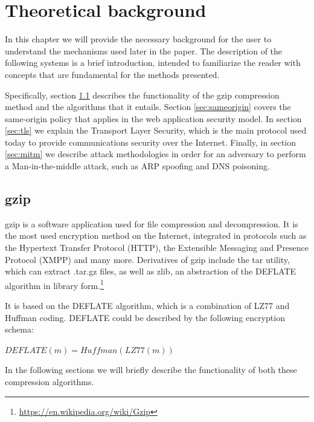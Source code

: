 \chapter{Theoretical background}\label{background}

In this chapter we will provide the necessary background for the user to
understand the mechanisms used later in the paper. The description of the
following systems is a brief introduction, intended to familiarize the reader
with concepts that are fundamental for the methods presented.

Specifically, section \ref{sec:gzip} describes the functionality of the gzip
compression method and the algorithms that it entails. Section
\ref{sec:sameorigin} covers the same-origin policy that applies in the web
application security model. In section \ref{sec:tls} we explain the Transport
Layer Security, which is the main protocol used today to provide communications
security over the Internet. Finally, in section \ref{sec:mitm} we describe
attack methodologies in order for an adversary to perform a Man-in-the-middle
attack, such as ARP spoofing and DNS poisoning.

\section{gzip}\label{sec:gzip}

gzip is a software application used for file compression and decompression. It
is the most used encryption method on the Internet, integrated in protocols such
as the Hypertext Transfer Protocol (HTTP), the Extensible Messaging and Presence
Protocol (XMPP) and many more. Derivatives of gzip include the tar utility,
which can extract .tar.gz files, as well as zlib, an abstraction of the DEFLATE
algorithm in library form.\footnote{\url{https://en.wikipedia.org/wiki/Gzip}}

It is based on the DEFLATE algorithm, which is a combination of LZ77 and Huffman
coding. DEFLATE could be described by the following encryption schema:

\begin{math}DEFLATE(m) = Huffman(LZ77(m))\end{math}

In the following sections we will briefly describe the functionality of both
these compression algorithms.

